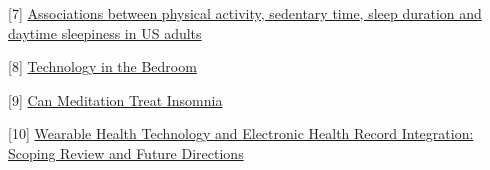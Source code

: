 \documentclass[
]{article}
\begin{document}
{[}7{]}
\href{https://www.sciencedirect.com/science/article/abs/pii/S0091743514002035}{Associations
between physical activity, sedentary time, sleep duration and daytime
sleepiness in US adults}

{[}8{]}
\href{https://www.sleepfoundation.org/bedroom-environment/technology-in-the-bedroom}{Technology
in the Bedroom}

{[}9{]}
\href{https://www.sleepfoundation.org/insomnia/treatment/meditation}{Can
Meditation Treat Insomnia}

{[}10{]}
\href{https://www.ncbi.nlm.nih.gov/pmc/articles/PMC6746089/}{Wearable
Health Technology and Electronic Health Record Integration: Scoping
Review and Future Directions}
\end{document}
